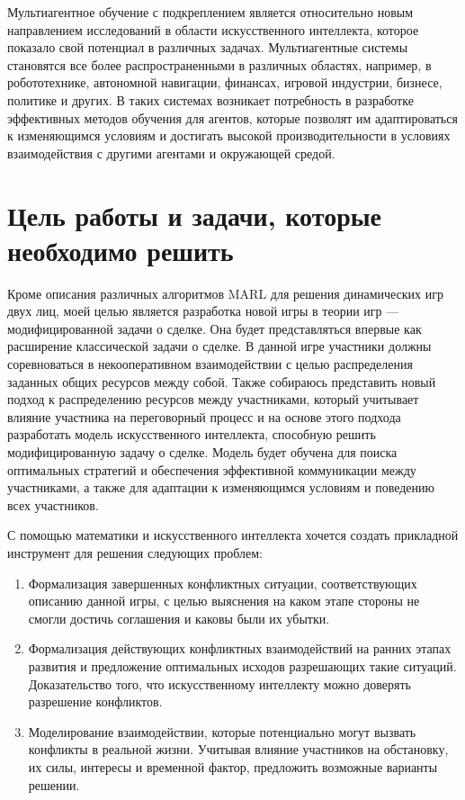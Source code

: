 Мультиагентное обучение с подкреплением является относительно новым направлением исследований в области искусственного интеллекта, которое показало свой потенциал в различных задачах. Мультиагентные системы становятся все более распространенными в различных областях, например, в робототехнике, автономной навигации, финансах, игровой индустрии, бизнесе, политике и других. В таких системах возникает потребность в разработке эффективных методов обучения для агентов, которые позволят им адаптироваться к изменяющимся условиям и достигать высокой производительности в условиях взаимодействия с другими агентами и окружающей средой.


\section{Цель работы и задачи, которые необходимо решить}

Кроме описания различных алгоритмов MARL для решения динамических игр двух лиц, моей целью является разработка новой игры в теории игр --- модифицированной задачи о сделке. Она будет представляться впервые как расширение классической задачи о сделке. В данной игре участники должны соревноваться в некооперативном взаимодействии с целью распределения заданных общих ресурсов между собой. Также собираюсь представить новый подход к распределению ресурсов между участниками, который учитывает влияние участника на переговорный процесс и на основе этого подхода разработать модель искусственного интеллекта, способную решить модифицированную задачу о сделке. Модель будет обучена для поиска оптимальных стратегий и обеспечения эффективной коммуникации между участниками, а также для адаптации к изменяющимся условиям и поведению всех участников.

С помощью математики и искусственного интеллекта хочется создать прикладной инструмент для решения следующих проблем:

\begin{enumerate}
    \item Формализация завершенных конфликтных ситуации, соответствующих описанию данной игры, с целью выяснения на каком этапе стороны не смогли достичь соглашения и каковы были их убытки.

    \item Формализация действующих конфликтных взаимодействий на ранних этапах развития и предложение оптимальных исходов разрешающих такие ситуаций. Доказательство того, что искусственному интеллекту можно доверять разрешение конфликтов.

    \item Моделирование взаимодействии, которые потенциально могут вызвать конфликты в реальной жизни. Учитывая влияние участников на обстановку, их силы, интересы и временной фактор, предложить возможные варианты решении.
\end{enumerate}

